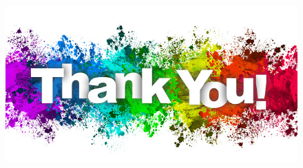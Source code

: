 \documentclass[slidestop,usepdftitle=false,10pt]{beamer}
\begin{document}
	\begin{frame}
	    \bigskip
	    \begin{figure}
	        \centering
	        \includegraphics[width=0.7\linewidth]{thank.jpg}
	    \end{figure}
	\end{frame}
	
	
	
	
	
	
	
	
	
	
	
	
	
	
	
	
	
	
	
	
	
\end{document}
